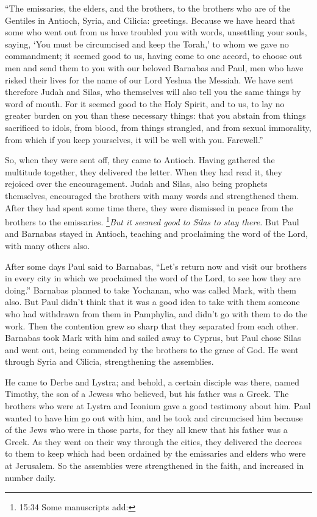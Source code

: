 “The emissaries, the elders, and the brothers, to the brothers who are of the Gentiles in
Antioch, Syria, and Cilicia: greetings.
\myverse{}Because we have heard that some who went out from us have troubled you with
words, unsettling your souls, saying, ‘You must be circumcised and keep the Torah,’ to whom we gave no
commandment;
\myverse{}it seemed good to us, having come to one accord, to choose out men and send
them to you with our beloved Barnabas and Paul,
\myverse{}men who have risked their lives for the name of our Lord Yeshua the Messiah.
\myverse{}We have sent therefore Judah and Silas, who themselves will also tell you
the same things by word of mouth.
\myverse{}For it seemed good to the Holy Spirit, and to us, to lay no greater burden
on you than these necessary things:
\myverse{}that you abstain from things sacrificed to idols, from blood, from things
strangled, and from sexual immorality, from which if you keep yourselves, it will be well with you. Farewell.”

\myverse{}So, when they were sent off, they came to Antioch. Having gathered
the multitude together, they delivered the letter.
\myverse{}When they had read it, they rejoiced over the encouragement.
\myverse{}Judah and Silas, also being prophets themselves, encouraged the brothers
with many words and strengthened them.
\myverse{}After they had spent some time there, they were dismissed in peace from the
brothers to the emissaries.
\myverse{}\footnote{15:34 Some manuscripts add:
}\textit{But it seemed good to Silas to stay there.
}
\myverse{}But Paul and Barnabas stayed in Antioch, teaching and proclaiming the word
of the Lord, with many others also.

\myverse{}After some days Paul said to Barnabas, “Let’s return now and
visit our brothers in every city in which we proclaimed the word of the Lord, to see how they are doing.”
\myverse{}Barnabas planned to take Yochanan, who was called Mark, with them also.
\myverse{}But Paul didn’t think that it was a good idea to take with them someone who
had withdrawn from them in Pamphylia, and didn’t go with them to do the work.
\myverse{}Then the contention grew so sharp that they separated from each other. Barnabas
took Mark with him and sailed away to Cyprus,
\myverse{}but Paul chose Silas and went out, being commended by the brothers to the
grace of God.
\myverse{}He went through Syria and Cilicia, strengthening the assemblies.


\mychapter{} \myverse*{}He came to Derbe and Lystra; and behold, a certain disciple was
there, named Timothy, the son of a Jewess who believed, but his father was a Greek.
\myverse{}The brothers who were at Lystra and Iconium gave a good testimony about him.
\myverse{}Paul wanted to have him go out with him, and he took and circumcised him because
of the Jews who were in those parts, for they all knew that his father was a Greek.
\myverse{}As they went on their way through the cities, they delivered the decrees to
them to keep which had been ordained by the emissaries and elders who were at Jerusalem.
\myverse{}So the assemblies were strengthened in the faith, and increased in number daily.

